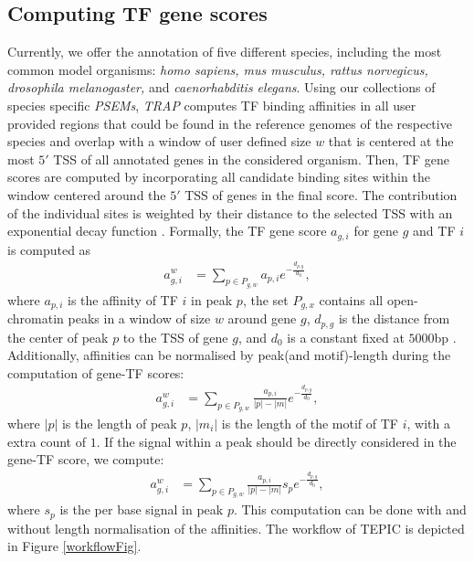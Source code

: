 \documentclass{article}
\begin{document}
\newpage
\mbox{}
\newpage
\subsection*{Computing TF gene scores}
Currently, we offer the annotation of five different species, including the most common model organisms: 
\textit{homo sapiens, mus musculus, rattus norvegicus, drosophila melanogaster,} and \textit{caenorhabditis elegans}.
Using our collections of species specific \textit{PSEMs}, \textit{TRAP} computes TF binding affinities in all user provided regions 
that could be found in the reference genomes of the respective species and 
overlap with a window of user defined size $w$ that is centered at the most $5'$ TSS of all annotated genes in the considered organism. 
Then, TF gene scores are computed by incorporating all candidate binding sites within the window centered around the $5'$ TSS of genes in the final score. 
The contribution of the individual sites is weighted by their distance to the selected TSS with an exponential decay function \cite{pmid19995984}.
Formally, the TF gene score $a_{g,i}$ for gene $g$ and TF $i$ is computed as
\begin{align}
a_{g,i}^{w}&=\sum_{p \in P_{g,w}} a_{p,i}e^{-\frac{d_{p,g}}{d_0}},
\end{align}
where $a_{p,i}$ is the affinity of TF $i$ in peak $p$, the set $P_{g,x}$ contains all open-chromatin peaks
in a window of size $w$ around gene $g$, $d_{p,g}$ is the distance from the center of peak $p$ to the TSS of gene $g$, and $d_0$ is a constant fixed at $5000$bp \cite{pmid19995984}.
Additionally, affinities can be normalised by peak(and motif)-length during the computation of gene-TF scores:
\begin{align}
a_{g,i}^{w}&=\sum_{p \in P_{g,w}} {\frac{a_{p,i}}{|p|-|m|}e^{-\frac{d_{p,g}}{d_0}}},
\end{align}
where $|p|$ is the length of peak $p$, $|m_i|$ is
the length of the motif of TF $i$, with a extra count of $1$.
If the signal within a peak should be directly considered in the gene-TF score, we compute:
\begin{align}
a_{g,i}^{w}&=\sum_{p \in P_{g,w}} {\frac{a_{p,i}}{|p|-|m|}s_{p}e^{-\frac{d_{p,g}}{d_0}}},
\end{align}
where $s_p$ is the per base signal in peak $p$. This computation can be done with and without length normalisation of the affinities. 
The workflow of TEPIC is depicted in Figure \ref{workflowFig}.
\end{document}
